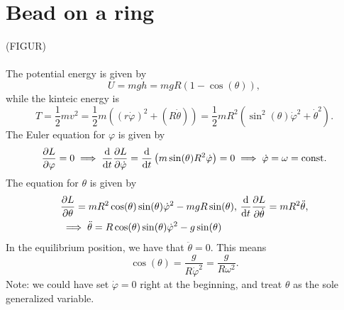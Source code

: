 \documentclass{article}
\begin{document}
    \section{Bead on a ring}
        (FIGUR) \\ \\
        The potential energy is given by
        \begin{equation*}
            U = mgh = mgR(1 - \cos(\theta)),
        \end{equation*}
        while the kinteic energy is
        \begin{equation*}
            T = \frac{1}{2}m v^2 = \frac{1}{2}m \left((r \dot \varphi)^2 + (R \dot \theta)\right) = \frac{1}{2}m R^2\left(\sin^2(\theta) \dot \varphi^2 + \dot\theta^2\right).
        \end{equation*}
        The Euler equation for $\varphi$ is given by
        \begin{equation*}
            \pdv{L}{\varphi} = 0 \implies \dv{t}\pdv{L}{\dot \varphi} = \dv{t}\left(m \sin(\theta)R^2 \dot \varphi\right) = 0 \implies \dot \varphi = \omega = \mathrm{const.}
        \end{equation*}
        The equation for $\theta$ is given by
        \begin{align*}
            &\pdv{L}{\theta} = m R^2 \cos(\theta) \sin(\theta) \dot \varphi^2 - mgR \sin(\theta), \, \dv{t} \pdv{L}{\dot \theta} = m R^2 \ddot \theta, \\
            & \implies \ddot \theta = R \cos(\theta) \sin(\theta) \dot \varphi^2  - g \sin(\theta)
        \end{align*}
        In the equilibrium position, we have that $\ddot \theta = 0$. This means
        \begin{equation*}
            \cos(\theta) = \frac{g }{R\dot \varphi^2} = \frac{g }{R\omega^2}.
        \end{equation*}
        Note: we could have set $\dot \varphi = 0$ right at the beginning, and treat $\theta$ as the sole generalized variable.
\end{document}
